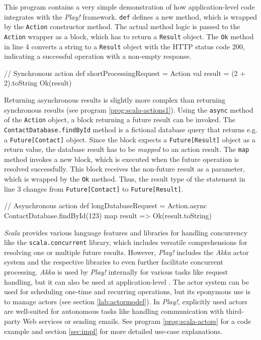 \begin{program}
  \caption{This program contains a very simple demonstration of how application-level code integrates with the \textit{Play!} framework. \texttt{def} defines a new method, which is wrapped by the \texttt{Action} constructor method. The actual method logic is passed to the \texttt{Action} wrapper as a block, which has to return a \texttt{Result} object. The \texttt{Ok} method in line 4 converts a string to a \texttt{Result} object with the HTTP status code 200, indicating a successful operation with a non-empty response.}
  \label{prog:scala-actions1}
  \begin{JavaCode}
// Synchronous action
def shortProcessingRequest = Action {
    val result = (2 + 2).toString
    Ok(result)
}
  \end{JavaCode}
\end{program}
\begin{program}
  \caption{Returning asynchronous results is slightly more complex than returning synchronous results (see program \ref{prog:scala-actions1}). Using the \texttt{async} method of the \texttt{Action} object, a block returning a future result can be invoked. The \texttt{ContactDatabase.findById} method is a fictional database query that returns e.g. a \texttt{Future[Contact]} object. Since the block expects a \texttt{Future[Result]} object as a return value, the database result has to be \textit{mapped} to an action result. The \texttt{map} method invokes a new block, which is executed when the future operation is resolved successfully. This block receives the non-future result as a parameter, which is wrapped by the \texttt{Ok} method. Thus, the result type of the statement in line 3 changes from \texttt{Future[Contact]} to \texttt{Future[Result]}.}
  \label{prog:scala-actions2}
  \begin{JavaCode}
// Asynchronous action
def longDatabaseRequest = Action.async {
    ContactDatabase.findById(123) map {
        result =>
            Ok(result.toString)
    }
}
  \end{JavaCode}
\end{program}

\textit{Scala} provides various language features and libraries for handling concurrency like the \texttt{scala.concurrent} library, which includes versatile comprehensions for resolving one or multiple future results. However, \textit{Play!} includes the \textit{Akka} actor system and the respective libraries to even further facilitate concurrent processing. \textit{Akka} is used by \textit{Play!} internally for various tasks like request handling, but it can also be used at application-level \cite[p. 83]{Scala}. The actor system can be used for scheduling one-time and recurring operations, but its eponymous use is to manage actors (see section \ref{lab:actormodel}). In \textit{Play!}, explicitly used actors are well-suited for autonomous tasks like handling communication with third-party Web services or sending emails. See program \ref{prog:scala-actors} for a code example and section \ref{sec:impl} for more detailed use-case explanations.

